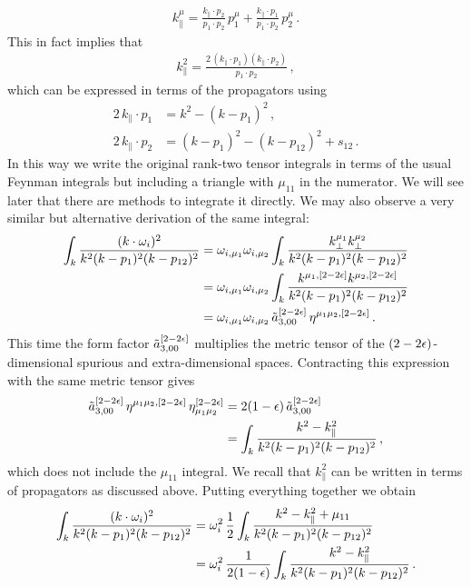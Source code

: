 \begin{align}
k_{\parallel}^\mu = \frac{k_{\parallel}\cdot p_2}{p_1\cdot p_2} \, p_1^\mu + \frac{k_{\parallel}\cdot p_1}{p_1\cdot p_2} \, p_2^\mu \,.
\end{align}
This in fact implies that 
\begin{align}
   k_{\parallel}^2 = \frac{2 \, (k_{\parallel}\cdot p_1) (k_{\parallel}\cdot p_2)}{p_1\cdot p_2}\,,
\end{align}
which can be expressed in terms of the propagators using
\begin{align}
  2 \, k_{\parallel}\cdot p_1 &= k^2 - (k-p_1)^2 \,, \\
  2 \, k_{\parallel}\cdot p_2 &= (k-p_1)^2 - (k-p_{12})^2 + s_{12} \,.
\end{align}
In this way we write the original rank-two tensor integrals in terms of the
usual Feynman integrals but including a triangle with $\mu_{11}$ in the
numerator. We will see later that there are methods to integrate it directly.
We may also observe a very similar but alternative derivation of the same integral:
\begin{align}
  \int_k \frac{(k\cdot\omega_i)^2}{k^2 (k-p_1)^2 (k-p_{12})^2} 
  &= \omega_{i,\mu_1} \omega_{i,\mu_2} \int_k \frac{k_\perp^{\mu_1} k_\perp^{\mu_2}}{k^2 (k-p_1)^2 (k-p_{12})^2} \\
  &= \omega_{i,\mu_1} \omega_{i,\mu_2} \int_k \frac{k^{\mu_1, [2-2\epsilon]} k^{\mu_2, [2-2\epsilon]}}{k^2 (k-p_1)^2 (k-p_{12})^2} \\
  &= \omega_{i,\mu_1} \omega_{i,\mu_2} \, \tilde{a}^{[2-2\epsilon]}_{3,00} \, \eta^{\mu_1\mu_2, [2-2\epsilon]}\,.
\end{align}
This time the form factor $\tilde{a}^{[2-2\epsilon]}_{3,00}$ multiplies the metric
tensor of the $(2-2\epsilon)$-dimensional spurious and extra-dimensional spaces. Contracting this expression with the same metric tensor gives
\begin{align}
\begin{aligned}
   \tilde{a}^{[2-2\epsilon]}_{3,00} \, \eta^{\mu_1\mu_2, [2-2\epsilon]} \, \eta_{\mu_1\mu_2}^{[2-2\epsilon]} &= 2(1-\epsilon) \, \tilde{a}^{[2-2\epsilon]}_{3,00} \\
   &= \int_k \frac{k^2-k_{\parallel}^2}{k^2 (k-p_1)^2 (k-p_{12})^2}\,,
 \end{aligned}
\end{align}
which does not include the $\mu_{11}$ integral. We recall that $k_{\parallel}^2$ can be written in terms of propagators as discussed above. Putting everything together we obtain
\begin{align}
\begin{aligned}
\int_k \frac{(k\cdot\omega_i)^2}{k^2 (k-p_1)^2 (k-p_{12})^2}
&= \omega_{i}^2 \, \frac{1}{2} \int_k \frac{k^2-k_{\parallel}^2+\mu_{11}}{k^2 (k-p_1)^2 (k-p_{12})^2} \\
&= \omega_{i}^2 \, \frac{1}{2(1-\epsilon)} \int_k \frac{k^2-k_{\parallel}^2}{k^2 (k-p_1)^2 (k-p_{12})^2}\,.
\end{aligned}
\end{align}
